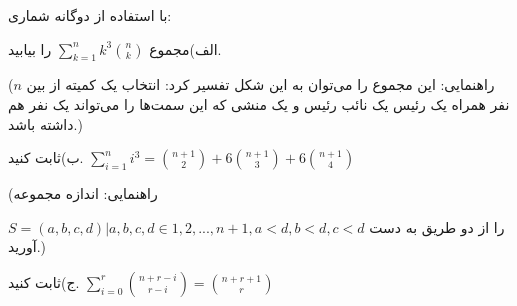 \EXERCISE
با استفاده از دوگانه شماری:

الف)مجموع
$\sum_{k=1}^{n} k^3 \binom n k$
را بیابید.

(راهنمایی: این مجموع را می‌توان به این شکل تفسیر کرد: انتخاب یک کمیته از بین
$n$
نفر همراه یک ‬‬‫رئیس‬ یک ‫نائب‬ ‫رئیس‬ و یک منشی که این سمت‌ها را می‌تواند یک نفر هم داشته باشد.)

ب)ثابت کنید.
$\sum_{i=1}^{n}i^3 = \binom{n+1}{2} + 6\binom{n+1}{3} + 6\binom{n+1}{4}$

(راهنمایی:
 اندازه مجموعه
 
$S = {(a, b, c, d) | a, b, c, d \in {1, 2, ..., n + 1}, a < d , b < d, c < d}$
را از دو طریق به دست آورید.)

ج)ثابت کنید.
$\sum_{i=0}^{r}\binom{n+r-i}{r-i} = \binom{n+r+1}{r}$